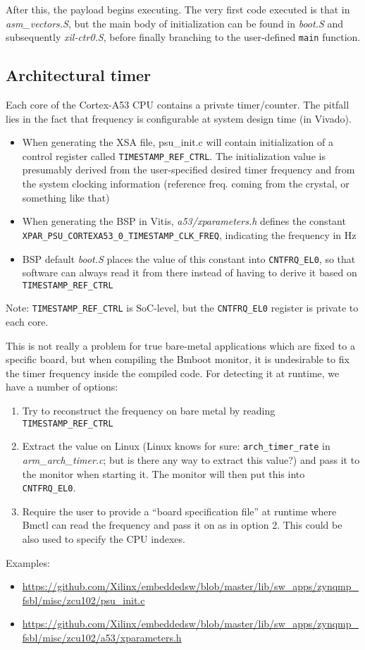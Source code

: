 After this, the payload begins executing. The very first code executed is that in \textit{asm\_vectors.S}, but the main body of initialization can be found in \textit{boot.S} and subsequently \textit{xil-ctr0.S}, before finally branching to the user-defined \texttt{main} function.


\subsection{Architectural timer}

Each core of the Cortex-A53 CPU contains a private timer/counter. The pitfall lies in the fact that frequency is configurable at system design time (in Vivado).

\begin{itemize}
    \item When generating the XSA file, psu\_init.c will contain initialization of a control register called \texttt{TIMESTAMP\_REF\_CTRL}. The initialization value is presumably derived from the user-specified desired timer frequency and from the system clocking information (reference freq. coming from the crystal, or something like that)
    \item When generating the BSP in Vitis, \textit{a53/xparameters.h} defines the constant \\ \texttt{XPAR\_PSU\_CORTEXA53\_0\_TIMESTAMP\_CLK\_FREQ}, indicating the frequency in Hz
    \item BSP default \textit{boot.S} places the value of this constant into \texttt{CNTFRQ\_EL0}, so that software can always read it from there instead of having to derive it based on \texttt{TIMESTAMP\_REF\_CTRL}
\end{itemize}

Note: \texttt{TIMESTAMP\_REF\_CTRL} is SoC-level, but the \texttt{CNTFRQ\_EL0} register is private to each core.

This is not really a problem for true bare-metal applications which are fixed to a specific board, but when compiling the Bmboot monitor, it is undesirable to fix the timer frequency inside the compiled code. For detecting it at runtime, we have a number of options:

\begin{enumerate}[label=(\alph*)]
    \item Try to reconstruct the frequency on bare metal by reading \texttt{TIMESTAMP\_REF\_CTRL}
    \item Extract the value on Linux (Linux knows for sure: \texttt{arch\_timer\_rate} in \textit{arm\_arch\_timer.c}; but is there any way to extract this value?) and pass it to the monitor when starting it. The monitor will then put this into \texttt{CNTFRQ\_EL0}.
    \item Require the user to provide a ``board specification file'' at runtime where Bmctl can read the frequency and pass it on as in option 2. This could be also used to specify the CPU indexes.
\end{enumerate}

Examples:

\begin{itemize}
    \item \url{https://github.com/Xilinx/embeddedsw/blob/master/lib/sw\_apps/zynqmp\_fsbl/misc/zcu102/psu\_init.c}
    \item \url{https://github.com/Xilinx/embeddedsw/blob/master/lib/sw\_apps/zynqmp\_fsbl/misc/zcu102/a53/xparameters.h}
\end{itemize}
